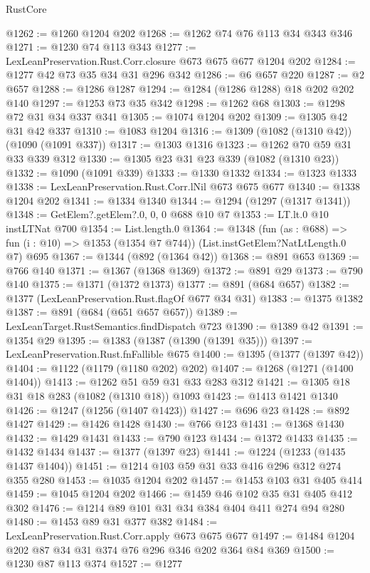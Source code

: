 \begin{lexlean}{RustCore}
\begin{coremodule}
@1262 := @1260 @1204 @202
@1268 := @1262 @74 @76 @113 @34 @343 @346
@1271 := @1230 @74 @113 @343
@1277 := LexLeanPreservation.Rust.Corr.closure @673 @675 @677 @1204 @202
@1284 := @1277 @42 @73 @35 @34 @31 @296 @342
@1286 := @6 @657 @220
@1287 := @2 @657
@1288 := @1286 @1287
@1294 := @1284 (@1286 @1288) @18 @202 @202 @140
@1297 := @1253 @73 @35 @342
@1298 := @1262 @68
@1303 := @1298 @72 @31 @34 @337 @341
@1305 := @1074 @1204 @202
@1309 := @1305 @42 @31 @42 @337
@1310 := @1083 @1204
@1316 := @1309 (@1082 (@1310 @42)) (@1090 (@1091 @337))
@1317 := @1303 @1316
@1323 := @1262 @70 @59 @31 @33 @339 @312
@1330 := @1305 @23 @31 @23 @339 (@1082 (@1310 @23))
@1332 := @1090 (@1091 @339)
@1333 := @1330 @1332
@1334 := @1323 @1333
@1338 := LexLeanPreservation.Rust.Corr.lNil @673 @675 @677
@1340 := @1338 @1204 @202
@1341 := @1334 @1340
@1344 := @1294 (@1297 (@1317 @1341))
@1348 := GetElem?.getElem?.{0, 0, 0} @688 @10 @7
@1353 := LT.lt.{0} @10 instLTNat @700
@1354 := List.length.{0}
@1364 := @1348
    (fun (as : @688) => fun (i : @10) => @1353 (@1354 @7 @744))
    (List.instGetElem?NatLtLength.{0} @7)
    @695
@1367 := @1344 (@892 (@1364 @42))
@1368 := @891 @653
@1369 := @766 @140
@1371 := @1367 (@1368 @1369)
@1372 := @891 @29
@1373 := @790 @140
@1375 := @1371 (@1372 @1373)
@1377 := @891 (@684 @657)
@1382 := @1377 (LexLeanPreservation.Rust.flagOf @677 @34 @31)
@1383 := @1375 @1382
@1387 := @891 (@684 (@651 @657 @657))
@1389 := LexLeanTarget.RustSemantics.findDispatch @723
@1390 := @1389 @42
@1391 := @1354 @29
@1395 := @1383 (@1387 (@1390 (@1391 @35)))
@1397 := LexLeanPreservation.Rust.fnFallible @675
@1400 := @1395 (@1377 (@1397 @42))
@1404 := @1122 (@1179 (@1180 @202) @202)
@1407 := @1268 (@1271 (@1400 @1404))
@1413 := @1262 @51 @59 @31 @33 @283 @312
@1421 := @1305 @18 @31 @18 @283 (@1082 (@1310 @18)) @1093
@1423 := @1413 @1421 @1340
@1426 := @1247 (@1256 (@1407 @1423))
@1427 := @696 @23
@1428 := @892 @1427
@1429 := @1426 @1428
@1430 := @766 @123
@1431 := @1368 @1430
@1432 := @1429 @1431
@1433 := @790 @123
@1434 := @1372 @1433
@1435 := @1432 @1434
@1437 := @1377 (@1397 @23)
@1441 := @1224 (@1233 (@1435 @1437 @1404))
@1451 := @1214 @103 @59 @31 @33 @416 @296 @312 @274 @355 @280
@1453 := @1035 @1204 @202
@1457 := @1453 @103 @31 @405 @414
@1459 := @1045 @1204 @202
@1466 := @1459 @46 @102 @35 @31 @405 @412 @302
@1476 := @1214 @89 @101 @31 @34 @384 @404 @411 @274 @94 @280
@1480 := @1453 @89 @31 @377 @382
@1484 := LexLeanPreservation.Rust.Corr.apply @673 @675 @677
@1497 := @1484 @1204 @202 @87 @34 @31 @374 @76 @296 @346 @202 @364 @84 @369
@1500 := @1230 @87 @113 @374
@1527 := @1277

\end{coremodule}
\end{lexlean}
